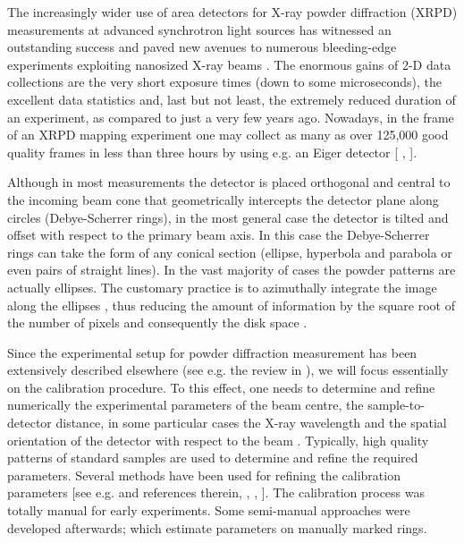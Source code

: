 \documentclass[preprint]{iucr}              %
\begin{document}
The increasingly wider use of area detectors for X-ray powder diffraction (XRPD)
measurements at advanced synchrotron light sources has witnessed an outstanding
success and paved new avenues to numerous bleeding-edge experiments exploiting
nanosized X-ray beams \cite {dinnebier2012future}.   
The enormous gains of 2-D data collections are the very short exposure times
(down to some microseconds), the excellent data statistics and, last but not
least, the extremely reduced duration of an experiment, as compared to just a
very few years ago. Nowadays, in the frame of an XRPD mapping experiment one may
collect as many as over 125,000 good quality frames in less than three hours by
using e.g. an Eiger detector [\cite{johnson2012capturing} ,
\cite{gorfman2014sub}].      

Although in most measurements the detector is placed orthogonal and central to
the incoming beam cone that geometrically intercepts the detector plane along
circles (Debye-Scherrer rings), in the most general case the detector is tilted
and offset with respect to the primary beam axis. 
In this case the
Debye-Scherrer rings can take the form of any conical section (ellipse,
hyperbola and parabola or even pairs of straight lines).     
In the vast majority of cases the powder patterns are actually ellipses. The
customary practice is to azimuthally integrate the image along the ellipses
\cite{hammersley1996two}, thus reducing the amount of information by the square
root of the number of pixels and consequently the disk space \cite
{dinnebier2012future}.    

Since the experimental setup for powder diffraction measurement has been
extensively described elsewhere (see e.g. the review in
\cite{lavina2014modern}), we will focus essentially on the calibration
procedure. To this effect, one needs to determine and refine numerically the
experimental parameters of the beam centre, the sample-to-detector distance, in
some particular cases the X-ray wavelength and the spatial orientation of the
detector with respect to the beam \cite{de2014xrdua}. 
Typically, high quality patterns of standard samples are used to determine and
refine the required parameters.  
Several methods have been used for refining the calibration parameters [see e.g.
\cite{dinnebier2012future} and references therein, \cite{de2014xrdua},
\cite{tantau2014high}, \cite{lutterotti2014rietveld}].  
The calibration process was totally manual for early experiments. 
Some semi-manual approaches were developed afterwards; which estimate parameters 
on manually marked rings.
\end{document}
